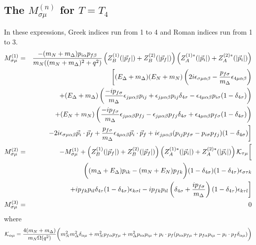 \documentclass[12pt]{article}
\begin{document}
\subsection{The $M_{\sigma\mu}^{(n)}$ for $T=T_4$}

In these expressions, Greek indices run from 1 to 4
and Roman indices run from 1 to 3.
\begin{eqnarray}
M_{\sigma\mu}^{(1)}
 &=& \frac{-(m_N+m_\Delta)p_{i\alpha}p_{f\beta}}{m_N((m_N+m_\Delta)^2+q^2)}
     \left(Z_B^{(1)}(|\vec{p}_f|)+Z_B^{(2)}(|\vec{p}_f|)\right)
     \left(Z_A^{(1)*}(|\vec{p}_i|)+Z_A^{(2)*}(|\vec{p}_i|)\right) \nonumber \\
 & & \bigg[(E_\Delta+m_\Delta)(E_N+m_N)\left(2i\epsilon_{\sigma\mu\alpha\beta}
     -\frac{p_{f\sigma}}{m_\Delta}\epsilon_{4\mu\alpha\beta}\right) \nonumber \\
 & & +(E_\Delta+m_\Delta)\left(\frac{-ip_{f\sigma}}{m_\Delta}
     \epsilon_{j\mu\alpha\beta}p_{ij}
     +\epsilon_{j\mu\alpha\beta}p_{ij}\delta_{4\sigma}
     -\epsilon_{4\mu\alpha\beta}p_{i\sigma}(1-\delta_{4\sigma})\right)
     \nonumber \\
 & & +(E_N+m_N)\left(\frac{-ip_{f\sigma}}{m_\Delta}
     \epsilon_{j\mu\alpha\beta}p_{fj}
     -\epsilon_{j\mu\alpha\beta}p_{fj}\delta_{4\sigma}
     +\epsilon_{4\mu\alpha\beta}p_{f\sigma}(1-\delta_{4\sigma})\right)
     \nonumber \\
 & & - 2i\epsilon_{\sigma\mu\alpha\beta}\vec p_i\cdot\vec p_f
     + \frac{p_{f\sigma}}{m_\Delta}\epsilon_{4\mu\alpha\beta}\vec p_i\cdot\vec
       p_f + i\epsilon_{j\mu\alpha\beta}(p_{ij}p_{f\sigma}-p_{i\sigma}p_{fj})
       (1-\delta_{4\sigma})\bigg] \\
M_{\sigma\mu}^{(2)}
 &=& -M_{\sigma\mu}^{(1)} 
     + \left(Z_B^{(1)}(|\vec{p}_f|)+Z_B^{(2)}(|\vec{p}_f|)\right)
       \left(Z_A^{(1)*}(|\vec{p}_i|)+Z_A^{(2)*}(|\vec{p}_i|)\right)
       {\cal K}_{\tau\mu}\bigg[
       \nonumber \\
&& \bigg((m_\Delta+E_\Delta)p_{ik}-(m_N+E_N)p_{fk}\bigg)(1-\delta_{4\sigma})
   (1-\delta_{4\tau})\epsilon_{\sigma\tau k} \nonumber \\
&& +ip_{fk}p_{il}\delta_{4\tau}(1-\delta_{4\sigma})\epsilon_{k\sigma l}
   -ip_{fk}p_{il}\left(\delta_{4\sigma}+\frac{ip_{f\sigma}}{m_\Delta}\right)
   (1-\delta_{4\tau})\epsilon_{k\tau l}\bigg] \\
M_{\sigma\mu}^{(3)} &=& 0
\end{eqnarray}
where
\[
{\cal K}_{\alpha\mu} = \frac{4(m_N+m_\Delta)}{m_N\Omega(q^2)}\bigg(
m_N^2m_\Delta^2\delta_{\alpha\mu}+m_N^2p_{f\alpha}p_{f\mu}
+m_\Delta^2p_{i\alpha}p_{i\mu}
+p_i\cdot p_f(p_{i\alpha}p_{f\mu}+p_{f\alpha}p_{i\mu}-p_i\cdot
p_f\delta_{\alpha\mu})\bigg)
\]
\end{document}
